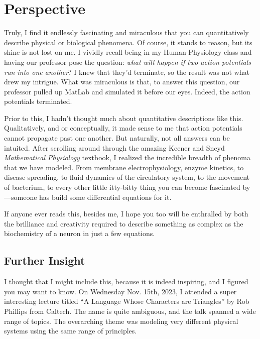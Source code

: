 \section{Perspective}

Truly, I find it endlessly fascinating and miraculous that you can quantitatively describe physical or biological phenomena. Of course, it stands to reason, but its shine is not lost on me. I vividly recall being in my Human Physiology class and having our professor pose the question: \textit{what will happen if two action potentials run into one another}? I knew that they'd terminate, so the result was not what drew my intrigue. What was miraculous is that, to answer this question, our professor pulled up MatLab and simulated it before our eyes. Indeed, the action potentials terminated.\newline

Prior to this, I hadn't thought much about quantitative descriptions like this. Qualitatively, and or conceptually, it made sense to me that action potentials cannot propagate past one another. But naturally, not all answers can be intuited. After scrolling around through the amazing Keener and Sneyd \textit{Mathematical Physiology} textbook, I realized the incredible breadth of phenoma that we have modeled. From membrane electrophysiology, enzyme kinetics, to disease spreading, to fluid dynamics of the circulatory system, to the movement of bacterium, to every other little itty-bitty thing you can become fascinated by---someone has build some differential equations for it.\newline

If anyone ever reads this, besides me, I hope you too will be enthralled by both the brilliance and creativity required to describe something as complex as the biochemistry of a neuron in just a few equations. 

\subsection{Further Insight}

I thought that I might include this, because it is indeed inspiring, and I figured you may want to know. On Wednesday Nov. 15th, 2023, I attended a super interesting lecture titled ``A Language Whose Characters are Triangles” by Rob Phillips from Caltech. The name is quite ambiguous, and the talk spanned a wide range of topics. The overarching theme was modeling very different physical systems using the same range of principles.\newline


